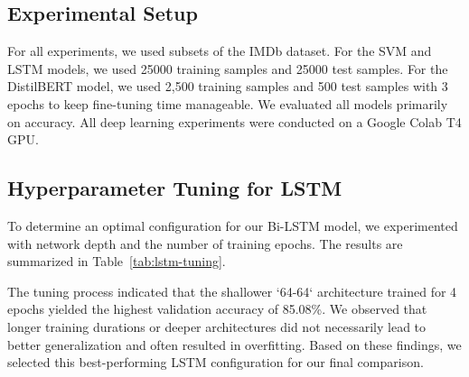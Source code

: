 \documentclass[11pt]{article}
\begin{document}
\subsection{Experimental Setup}
For all experiments, we used subsets of the IMDb dataset. For the SVM and LSTM models, we used 25000 training samples and 25000 test samples. For the DistilBERT model, we used 2,500 training samples and 500 test samples with 3 epochs to keep fine-tuning time manageable. We evaluated all models primarily on accuracy. All deep learning experiments were conducted on a Google Colab T4 GPU.

\subsection{Hyperparameter Tuning for LSTM}
To determine an optimal configuration for our Bi-LSTM model, we experimented with network depth and the number of training epochs. The results are summarized in Table~\ref{tab:lstm-tuning}.

\begin{table}[h!]
\centering
{}
\caption{Performance of LSTM models with different depths and epochs. Best validation accuracy shows the peak performance before significant overfitting.}
\label{tab:lstm-tuning}
\end{table}

The tuning process indicated that the shallower `64-64` architecture trained for 4 epochs yielded the highest validation accuracy of 85.08\%. We observed that longer training durations or deeper architectures did not necessarily lead to better generalization and often resulted in overfitting. Based on these findings, we selected this best-performing LSTM configuration for our final comparison.
\end{document}
